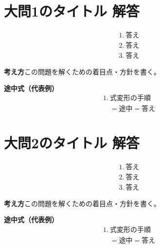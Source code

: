 \documentclass[paper=b4j,landscape,twocolumn,fleqn]{jlreq}
\newcommand{\kangaekata}[1]{\vspace{2pt}\noindent\textbf{考え方}\quad #1\par\vspace{2pt}}
\newcommand{\tochushiki}[1]{%
  \noindent\textbf{途中式（代表例）}
  \begin{align*}
    #1
  \end{align*}
}
\begin{document}
\normalsize

\section{大問1のタイトル \quad 解答}
\begin{align*}
&1.\  \text{答え}\\[0.45em]
&2.\  \text{答え}\\[0.45em]
&3.\  \text{答え}
\end{align*}

\kangaekata{この問題を解くための着目点・方針を書く。}

\tochushiki{
  &1.\ \text{式変形の手順}\\
  &\quad = \text{途中} = \text{答え}
}


\newpage

\section{大問2のタイトル \quad 解答}
\begin{align*}
&1.\  \text{答え}\\[0.45em]
&2.\  \text{答え}\\[0.45em]
&3.\  \text{答え}
\end{align*}

\kangaekata{この問題を解くための着目点・方針を書く。}

\tochushiki{
  &1.\ \text{式変形の手順}\\
  &\quad = \text{途中} = \text{答え}
}

\end{document}
